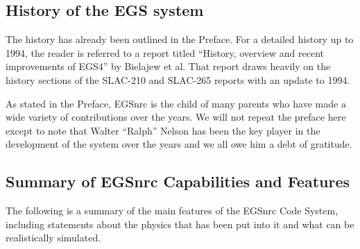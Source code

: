 \subsection{History of the EGS system}
The history has already been outlined in the Preface. For a detailed
history up to
1994, the reader is referred to a report titled  ``History, overview and
recent improvements of EGS4'' by Bielajew et al. That
report draws heavily on the history sections of the
SLAC-210\cite{FN78} and SLAC-265\cite{Ne85} reports with an update to
1994.

As stated in the Preface, EGSnrc is the child of many parents who have
made a wide variety of contributions over the years. We will not repeat
the preface here except to note that Walter ``Ralph'' Nelson has been
the key player in the development of the system over the years and we
all owe him a debt of gratitude.


\subsection{Summary of EGSnrc Capabilities and Features}

The following is a summary of the main features of the EGSnrc
Code System, including statements about the physics that
has been put into it and what can be realistically simulated.

